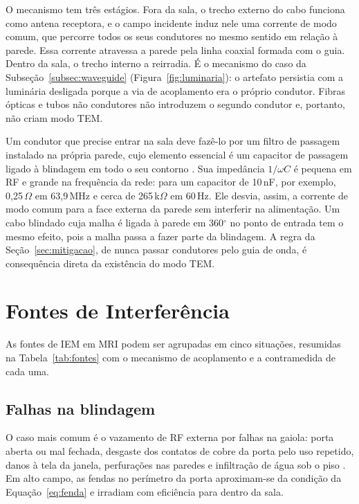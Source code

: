 \documentclass[portuguese]{sbcreviews-2025}%
\begin{document}
O mecanismo tem três estágios. Fora da sala, o trecho externo do cabo funciona como antena receptora, e o campo incidente induz nele uma corrente de modo comum, que percorre todos os seus condutores no mesmo sentido em relação à parede. Essa corrente atravessa a parede pela linha coaxial formada com o guia. Dentro da sala, o trecho interno a reirradia. É o mecanismo do caso da Subseção~\ref{subsec:waveguide} (Figura~\ref{fig:luminaria}): o artefato persistia com a luminária desligada porque a via de acoplamento era o próprio condutor. Fibras ópticas e tubos não condutores não introduzem o segundo condutor e, portanto, não criam modo TEM.

Um condutor que precise entrar na sala deve fazê-lo por um filtro de passagem instalado na própria parede, cujo elemento essencial é um capacitor de passagem ligado à blindagem em todo o seu contorno \citep{ott2009}. Sua impedância $1/\omega C$ é pequena em RF e grande na frequência da rede: para um capacitor de 10\,nF, por exemplo, 0,25\,$\Omega$ em 63,9\,MHz e cerca de 265\,k$\Omega$ em 60\,Hz. Ele desvia, assim, a corrente de modo comum para a face externa da parede sem interferir na alimentação. Um cabo blindado cuja malha é ligada à parede em 360$^{\circ}$ no ponto de entrada tem o mesmo efeito, pois a malha passa a fazer parte da blindagem. A regra da Seção~\ref{sec:mitigacao}, de nunca passar condutores pelo guia de onda, é consequência direta da existência do modo TEM.


\section{Fontes de Interferência}
\label{sec:fontes}

As fontes de IEM em MRI podem ser agrupadas em cinco situações, resumidas na Tabela~\ref{tab:fontes} com o mecanismo de acoplamento e a contramedida de cada uma.

\subsection{Falhas na blindagem}
\label{subsec:deficiencia}

O caso mais comum é o vazamento de RF externa por falhas na gaiola: porta aberta ou mal fechada, desgaste dos contatos de cobre da porta pelo uso repetido, danos à tela da janela, perfurações nas paredes e infiltração de água sob o piso \citep{kwok2024rf}. Em alto campo, as fendas no perímetro da porta aproximam-se da condição da Equação~\eqref{eq:fenda} e irradiam com eficiência para dentro da sala.
\end{document}
